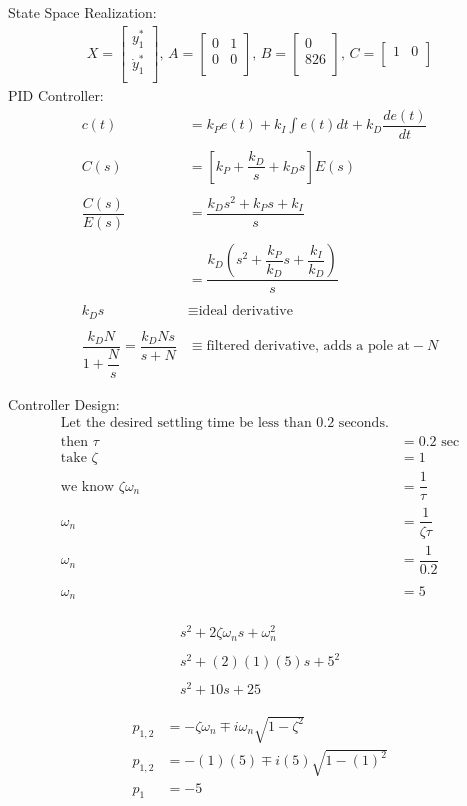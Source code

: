 \documentclass[12pt]{report}
\begin{document}
State Space Realization:
\begin{align} 
X =\begin{bmatrix}
  y_{1}^{*} \\
  \dot{y}_{1}^{*} \\
\end{bmatrix},\,
A =\begin{bmatrix}
    0 &1\\
   0 &0\\
\end{bmatrix},\,
B =\begin{bmatrix}
    0\\
   826\\
\end{bmatrix},\,
C =\begin{bmatrix}
    1 &0\\
\end{bmatrix}
\end{align}
\newline
PID Controller:
\begin{align}
c(t) &= k_{P}e(t) + k_{I} \int e(t)dt + k_{D}\dfrac{de(t)}{dt}\\\nonumber
\\
C(s) & = \left[ k_{P} + \dfrac{k_{D}}{s} + k_{D}s\right]E(s)\\\nonumber
\\
\dfrac{C(s)}{E(s)} & = \dfrac{k_{D}s^{2} + k_{P}s +k_{I}} {s}\\\nonumber
\\
&=\dfrac{k_{D}\left(s^{2}+ \dfrac{k_{P}}{k_{D}}s + \dfrac{k_{I}}{k_{D}}\right)}{s}\\\nonumber
\\
k_{D}s &\equiv \text{ideal derivative}\\\nonumber
\\
\dfrac{k_{D}N}{1 + \dfrac{N}{s}} = \dfrac{k_{D}Ns}{s + N} &\equiv \text{filtered derivative, adds a pole at} -N 
\end{align}

Controller Design:
\begin{align}
\text{Let the desired settling time be less than 0.2 seconds.}\\
\text{then }\tau &= 0.2 \text{ sec}\\
\text{take }\zeta &= 1\\
\text{we know }\zeta\omega_{n} &= \dfrac{1}{\tau}\\
\omega_{n} &= \dfrac{1}{\zeta\tau}\\
\omega_{n} &= \dfrac{1}{0.2}\\\nonumber
\\
\omega_{n} &= 5\\\nonumber
\end{align}

\begin{align}
s^{2} + 2\zeta\omega_{n}s + \omega_{n}^{2}\\\nonumber
\\
s^{2} + (2)(1)(5)s + 5^{2}\\\nonumber
\\
s^{2} + 10s + 25
\end{align}

\begin{align}
p_{1,2} &= -\zeta\omega_{n} \mp i\omega_{n}\sqrt{1 - \zeta^{2}}\\
p_{1,2} &= -(1)(5) \mp i(5)\sqrt{1-(1)^{2}}\\
p_{1} &= -5
\end{align}
\end{document}
